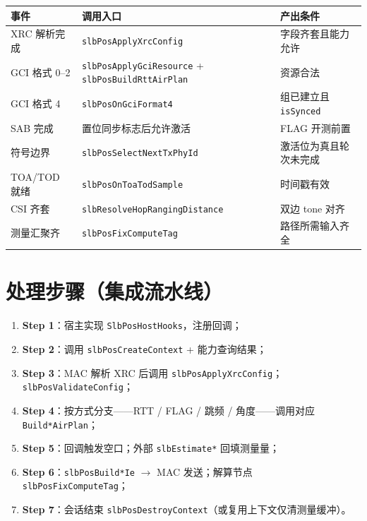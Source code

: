 \documentclass[11pt,a4paper]{ctexart}
\begin{document}
\begin{table}[h]
\centering
\small
\begin{tabular}{L{3.2cm}L{4.5cm}L{5.5cm}}
\toprule
\textbf{事件} & \textbf{调用入口} & \textbf{产出条件} \\
\midrule
XRC 解析完成 & \texttt{slbPosApplyXrcConfig} & 字段齐套且能力允许 \\
GCI 格式 0--2 & \texttt{slbPosApplyGciResource} + \texttt{slbPosBuildRttAirPlan} & 资源合法 \\
GCI 格式 4 & \texttt{slbPosOnGciFormat4} & 组已建立且 \texttt{isSynced} \\
SAB 完成 & 置位同步标志后允许激活 & FLAG 开测前置 \\
符号边界 & \texttt{slbPosSelectNextTxPhyId} & 激活位为真且轮次未完成 \\
TOA/TOD 就绪 & \texttt{slbPosOnToaTodSample} & 时间戳有效 \\
CSI 齐套 & \texttt{slbResolveHopRangingDistance} & 双边 tone 对齐 \\
测量汇聚齐 & \texttt{slbPosFixComputeTag} & 路径所需输入齐全 \\
\bottomrule
\end{tabular}
\end{table}

\section{处理步骤（集成流水线）}

\begin{enumerate}[nosep]
  \item \textbf{Step 1}：宿主实现 \texttt{SlbPosHostHooks}，注册回调；
  \item \textbf{Step 2}：调用 \texttt{slbPosCreateContext} + 能力查询结果；
  \item \textbf{Step 3}：MAC 解析 XRC 后调用 \texttt{slbPosApplyXrcConfig}；\texttt{slbPosValidateConfig}；
  \item \textbf{Step 4}：按方式分支——RTT / FLAG / 跳频 / 角度——调用对应 \texttt{Build*AirPlan}；
  \item \textbf{Step 5}：回调触发空口；外部 \texttt{slbEstimate*} 回填测量量；
  \item \textbf{Step 6}：\texttt{slbPosBuild*Ie} $\rightarrow$ MAC 发送；解算节点 \texttt{slbPosFixComputeTag}；
  \item \textbf{Step 7}：会话结束 \texttt{slbPosDestroyContext}（或复用上下文仅清测量缓冲）。
\end{enumerate}
\end{document}
